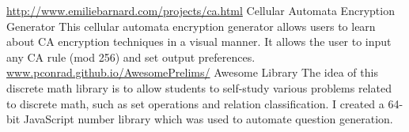 \begin{cventries}
  \cventry
     {\href{http://www.cellularautomata.info}{http://www.emiliebarnard.com/projects/ca.html}}
    {Cellular Automata Encryption Generator}
    {}
    {}
    {
         This cellular automata encryption generator allows users to learn about CA encryption techniques in a visual manner. It allows the user to input any CA rule (mod 256) and set output preferences.
    }
\cventry
     {\href{http://pconrad.github.io/AwesomePrelims/}{www.pconrad.github.io/AwesomePrelims/}}
    {Awesome Library}
    {}
    {}
    {
         The idea of this discrete math library is to allow students to self-study various problems related to discrete math, such as set operations and relation classification. I created a 64-bit JavaScript number library which was used to automate question generation. 
    }

\end{cventries}
